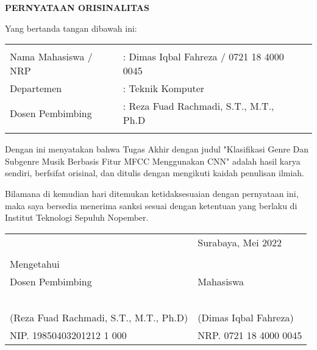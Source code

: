 \begin{center}
  \large
  \textbf{PERNYATAAN ORISINALITAS}
\end{center}

\thispagestyle{empty}

\vspace{2ex}


\noindent Yang bertanda tangan dibawah ini:

\noindent\begin{tabularx}{\textwidth}{X X l}
  & \\
  Nama Mahasiswa / NRP &: Dimas Iqbal Fahreza / 0721 18 4000 0045 \\
  Departemen &: Teknik Komputer \\
  Dosen Pembimbing &: Reza Fuad Rachmadi, S.T., M.T., Ph.D \\
  & \\
\end{tabularx}

Dengan ini menyatakan bahwa Tugas Akhir dengan judul "Klasifikasi Genre Dan Subgenre Musik Berbasis Fitur MFCC Menggunakan CNN" adalah hasil karya sendiri, berfsifat orisinal, dan ditulis dengan mengikuti kaidah penulisan ilmiah.

Bilamana di kemudian hari ditemukan ketidaksesuaian dengan pernyataan ini, maka saya bersedia menerima sanksi sesuai dengan ketentuan yang berlaku di Institut Teknologi Sepuluh Nopember.

\vspace{8ex}

\noindent\begin{tabularx}{\textwidth}{X l}
  & Surabaya, Mei 2022\\
  & \\
  Mengetahui & \\
  Dosen Pembimbing & Mahasiswa\\
  & \\
  & \\
  & \\
  & \\
  & \\
  (Reza Fuad Rachmadi, S.T., M.T., Ph.D) & (Dimas Iqbal Fahreza) \\
  NIP. 19850403201212 1 000& NRP. 0721 18 4000 0045\\
\end{tabularx}